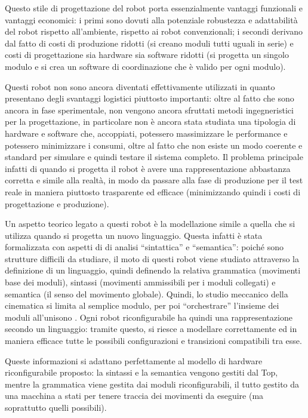\documentclass[a4paper,titlepage]{book}
\begin{document}
Questo stile di progettazione del robot porta essenzialmente vantaggi funzionali e vantaggi economici: i primi sono dovuti alla potenziale robustezza e adattabilità del robot rispetto all'ambiente, rispetto ai robot convenzionali; i secondi derivano dal fatto di costi di produzione ridotti (si creano moduli tutti uguali in serie) e costi di progettazione sia hardware sia software ridotti (si progetta un singolo modulo e si crea un software di coordinazione che è valido per ogni modulo).

Questi robot non sono ancora diventati effettivamente utilizzati in quanto presentano degli svantaggi logistici piuttosto importanti: oltre al fatto che sono ancora in fase sperimentale, non vengono ancora sfruttati metodi ingegneristici per la progettazione, in particolare non è ancora stata studiata una tipologia di hardware e software che, accoppiati, potessero massimizzare le performance e potessero minimizzare i consumi, oltre al fatto che non esiste un modo coerente e standard per simulare e quindi testare il sistema completo.
Il problema principale infatti di quando si progetta il robot è avere una rappresentazione abbastanza corretta e simile alla realtà, in modo da passare alla fase di produzione per il test reale in maniera piuttosto trasparente ed efficace (minimizzando quindi i costi di progettazione e produzione).

Un aspetto teorico legato a questi robot è la modellazione simile a quella che si utilizza quando si progetta un nuovo linguaggio. Questa infatti è stata formalizzata con aspetti di di analisi ``sintattica'' e ``semantica'': poiché sono strutture difficili da studiare, il moto di questi robot viene studiato attraverso la definizione di un linguaggio, quindi definendo la relativa grammatica (movimenti base dei moduli), sintassi (movimenti ammissibili per i moduli collegati) e semantica (il senso del movimento globale). Quindi, lo studio meccanico della cinematica si limita al semplice modulo, per poi ``orchestrare'' l'insieme dei moduli all'unisono \cite{robot_syntax}.
Ogni robot riconfigurabile ha quindi una rappresentazione secondo un linguaggio: tramite questo, si riesce a modellare correttamente ed in maniera efficace tutte le possibili configurazioni e transizioni compatibili tra esse.

Queste informazioni si adattano perfettamente al modello di hardware riconfigurabile proposto: la sintassi e la semantica vengono gestiti dal Top, mentre la grammatica viene gestita dai moduli riconfigurabili, il tutto gestito da una macchina a stati per tenere traccia dei movimenti da eseguire (ma soprattutto quelli possibili).
\end{document}
